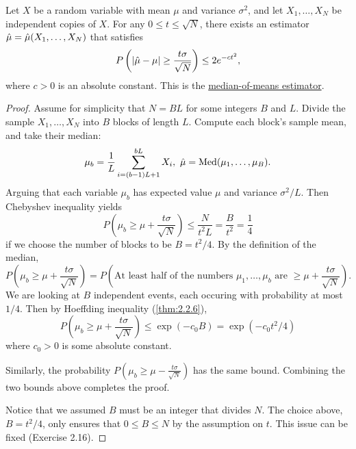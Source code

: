 \begin{theorem}
\label{thm:2.4.1}
Let $X$ be a random variable with mean $\mu$ and variance $\sigma^2$, and let $X_1, \dots, X_N$ be independent 
copies of $X$. For any $0 \leq t \leq \sqrt{N}$, there exists an estimator $\Hat{\mu} 
= \Hat{\mu}(X_1, \dots, X_N)$ that satisfies 
\[ P \left( |\Hat{\mu} - \mu| \geq \frac{t \sigma}{\sqrt{N}} \right) \leq 2e^{-ct^2}, \]
where $c > 0$ is an absolute constant. This is the \underline{median-of-means estimator}.
\end{theorem}

\begin{proof}
Assume for simplicity that $N = BL$ for some integers $B$ and $L$. Divide the sample $X_1, \dots, X_N$ into 
$B$ blocks of length $L$. Compute each block's sample mean, and take their median:
\[ \mu_b = \frac{1}{L}\sum_{i = (b - 1)L + 1}^{bL} X_i, \ \Hat{\mu} = \mathrm{Med}(\mu_1, \dots, \mu_B). \]
Arguing that each variable $\mu_b$ has expected value $\mu$ and variance $\sigma^2 / L$. Then Chebyshev 
inequality yields 
\[ P \left( \mu_b \geq \mu + \frac{t \sigma}{\sqrt{N}} \right) \leq \frac{N}{t^2 L} = \frac{B}{t^2} 
= \frac{1}{4} \]
if we choose the number of blocks to be $B = t^2 / 4$. By the definition of the median, 
\[ P \left( \mu_b \geq \mu + \frac{t \sigma}{\sqrt{N}} \right) 
= P \left( \text{At least half of the numbers } \mu_1, \dots, \mu_b \text{ are } \geq 
\mu + \frac{t \sigma}{\sqrt{N}} \right). \]
We are looking at $B$ independent events, each occuring with probability at most $1/4$. Then by Hoeffding 
inequality (\cref{thm:2.2.6}), 
\[ P \left( \mu_b \geq \mu + \frac{t \sigma}{\sqrt{N}} \right) \leq \exp{(-c_0 B)} = \exp{(-c_0 t^2 / 4)} \]
where $c_0 > 0$ is some absolute constant.

Similarly, the probability $P \left( \mu_b \geq \mu - \frac{t \sigma}{\sqrt{N}} \right)$ has the same 
bound. Combining the two bounds above completes the proof.

Notice that we assumed $B$ must be an integer that divides $N$. The choice above, $B = t^2 / 4$, only ensures 
that $0 \leq B \leq N$ by the assumption on $t$. This issue can be fixed (Exercise 2.16).
\end{proof}



